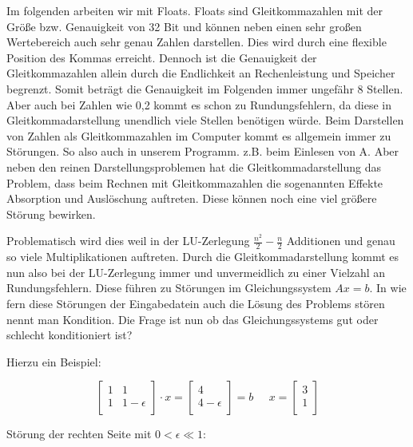 \documentclass[course=erap]{aspdoc}
\begin{document}
Im folgenden arbeiten wir mit Floats. Floats sind Gleitkommazahlen mit der Größe 
bzw. Genauigkeit von 32 Bit und können neben einen sehr großen Wertebereich auch 
sehr genau Zahlen darstellen. Dies wird durch eine flexible Position des Kommas erreicht.
 Dennoch ist die Genauigkeit der Gleitkommazahlen allein durch die Endlichkeit an 
Rechenleistung und Speicher begrenzt. Somit beträgt die 
Genauigkeit im Folgenden immer ungefähr 8 Stellen. Aber auch bei Zahlen wie 
0,2 kommt es schon zu Rundungsfehlern, da diese in Gleitkommadarstellung unendlich 
viele Stellen benötigen würde. Beim Darstellen von Zahlen als Gleitkommazahlen im Computer
 kommt es allgemein immer zu Störungen. So also auch in unserem Programm. z.B. beim Einlesen von A.
Aber neben den reinen Darstellungsproblemen hat die Gleitkommadarstellung das Problem, dass beim Rechnen mit 
Gleitkommazahlen die sogenannten Effekte Absorption und Auslöschung auftreten. Diese können noch eine viel größere Störung bewirken.

Problematisch wird dies weil in der LU-Zerlegung $\frac{n^2}{2} - \frac{n}{2} $
Additionen und genau so viele Multiplikationen auftreten\cite{LUGenauigkeit}.
Durch die Gleitkommadarstellung kommt es nun also bei der LU-Zerlegung immer und 
unvermeidlich zu einer Vielzahl an Rundungsfehlern. Diese führen zu Störungen im Gleichungssystem $Ax=b$. 
In wie fern diese Störungen der Eingabedatein auch die Lösung des Problems stören nennt man Kondition. 
Die Frage ist nun ob das Gleichungssystems gut oder schlecht konditioniert ist?


Hierzu ein Beispiel:

\begin{equation}
\label{absBeis}
 \begin{bmatrix}
 1	& 1	 \\
 1	& 1-\epsilon\\

 \end{bmatrix}
 \cdot x = 
  \begin{bmatrix}
 4 \\
 4- \epsilon\\

 \end{bmatrix}
  = b\;\;\;\;\;
  x = 
  \begin{bmatrix}
 3 \\
 1\\
\end{bmatrix}
\end{equation}

Störung der rechten Seite mit $ 0 < \epsilon \ll 1$:
\end{document}
